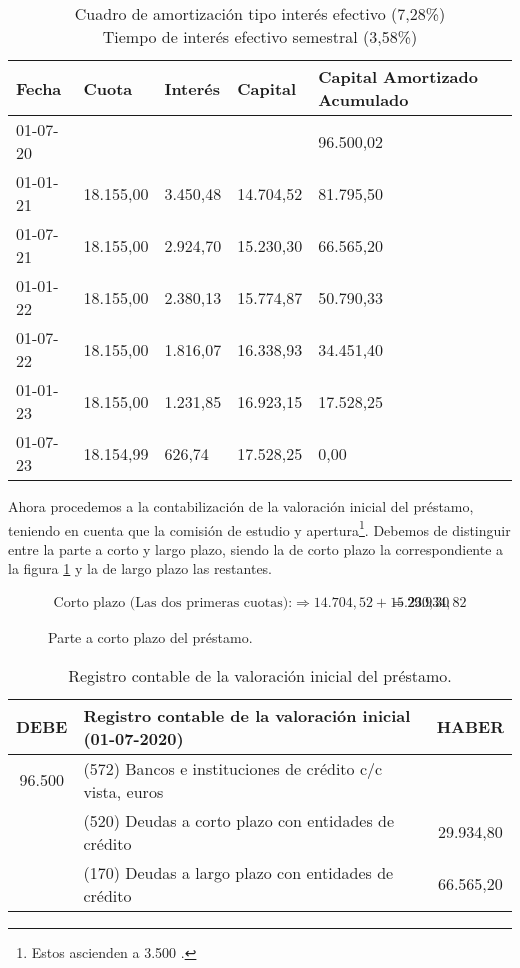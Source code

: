 \begin{table}[h]
    \centering
    \begin{tabular}{p{2cm}p{2cm}p{2cm}p{2cm}p{2cm}p{2cm}}
        \toprule
        \textbf{Fecha} & \textbf{Cuota} & \textbf{Interés} & \textbf{Capital} & \textbf{Capital Amortizado Acumulado} \\
        \midrule
        01-07-20 & & & & 96.500,02 \\
        01-01-21 & 18.155,00 & 3.450,48 & 14.704,52 & 81.795,50 \\
        01-07-21 & 18.155,00 & 2.924,70 & 15.230,30 & 66.565,20 \\
        01-01-22 & 18.155,00 & 2.380,13 & 15.774,87 & 50.790,33 \\
        01-07-22 & 18.155,00 & 1.816,07 & 16.338,93 & 34.451,40 \\
        01-01-23 & 18.155,00 & 1.231,85 & 16.923,15 & 17.528,25 \\
        01-07-23 & 18.154,99 & 626,74 & 17.528,25 & 0,00 \\
        \bottomrule
    \end{tabular}
    \caption{Cuadro de amortización tipo interés efectivo (7,28\%) \\ 
    Tiempo de interés efectivo semestral (3,58\%)}
    \label{tab:amortizacion_efectivo}
\end{table}

Ahora procedemos a la contabilización de la valoración inicial del préstamo, teniendo en cuenta que la comisión de estudio y apertura\footnote{Estos ascienden a 3.500 \e.}. Debemos de distinguir entre la parte a corto y largo plazo, siendo la de corto plazo la correspondiente a la figura \ref{fig:corto_plazo_ej2} y la de largo plazo las restantes.

\begin{figure}[H]
    \begin{align*}
        \text{Corto plazo (Las dos primeras cuotas):} \Rightarrow 14.704,52 + 15.230,30 & = 29.934,82 
    \end{align*}
    \caption{Parte a corto plazo del préstamo.}
    \label{fig:corto_plazo_ej2}
\end{figure}

\begin{table}[H]
    \centering
    \begin{tabular}{|c|p{6cm}|c|}
        \hline
        \rowcolor{blue!30}
        \textbf{DEBE} & \textbf{Registro contable de la valoración inicial (01-07-2020)} & \textbf{HABER} \\
        \hline
        96.500 & (572) Bancos e instituciones de crédito c/c vista, euros & \\
        \hline
        & (520) Deudas a corto plazo con entidades de crédito & 29.934,80 \\
        \hline
        & (170) Deudas a largo plazo con entidades de crédito & 66.565,20 \\
        \hline
    \end{tabular}
    \caption{Registro contable de la valoración inicial del préstamo.}
    \label{tabla:valoracion_inicial}
\end{table}

